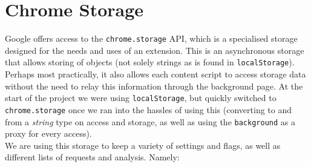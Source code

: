 \section{Chrome Storage} \label{storageSpecs}

Google offers access to the \texttt{chrome.storage} API, which is a specialised storage designed for the needs and uses of an extension. This is an asynchronous storage that allows storing of objects (not solely strings as is found in \texttt{localStorage}). Perhaps most practically, it also allows each content script to access storage data without the need to relay this information through the background page. At the start of the project we were using \texttt{localStorage}, but quickly switched to \texttt{chrome.storage} once we ran into the hassles of using this (converting to and from a \textit{string} type on access and storage, as well as using the \texttt{background} as a proxy for every access). \\

We are using this storage to keep a variety of settings and flags, as well as different lists of requests and analysis. Namely: 

